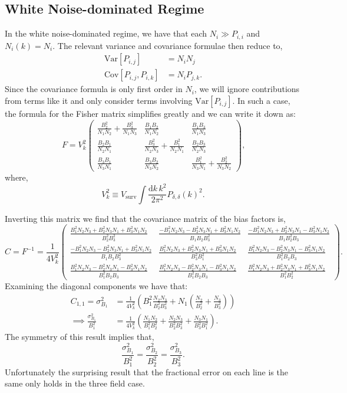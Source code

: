 \documentclass{aastex62}
\newcommand{\beq}{\begin{equation}}
\newcommand{\eeq}{\end{equation}}
\newcommand{\ps}[1]{\ensuremath{P_{#1,#1}}}
\newcommand{\xps}[2]{\ensuremath{P_{#1,#2}}}
\newcommand{\denps}{\ensuremath{P_{\delta,\delta}}}
\newcommand{\Var}[1]{\mathrm{Var}[#1]}
\newcommand{\Cov}[2]{\mathrm{Cov}[#1,#2]}
\begin{document}
\subsection{White Noise-dominated Regime} \label{ssec:tf_noisedom}
In the white noise-dominated regime, we have that each $N_i \gg \ps{i}$ and
$N_i(k) = N_i$. The relevant variance and covariance formulae then reduce to,
\beq\label{eq:var_cov}
\begin{split}
\Var{\xps{i}{j}} &= N_iN_j \\
\Cov{\xps{i}{j}}{\xps{i}{k}} &= N_i\xps{j}{k}\text{.}
\end{split}
\eeq
Since the covariance formula is only first order in $N_i$, we will ignore
contributions from terms like it and only consider terms involving
$\Var{\xps{i}{j}}$. In such a case, the formula for the Fisher matrix
simplifies greatly and we can write it down as:
\beq \label{eq:fmat_tf_exp}
F = V_k^2
\begin{pmatrix}
\frac{B_2^2}{N_1N_2}+\frac{B_3^2}{N_1N_3} & \frac{B_1B_2}{N_1N_2} & \frac{B_1B_3}{N_1N_3} \\
\frac{B_2B_1}{N_2N_1} & \frac{B_3^2}{N_2N_3}+\frac{B_1^2}{N_2N_1} & \frac{B_2B_3}{N_2N_3} \\
\frac{B_3B_1}{N_3N_1} & \frac{B_3B_2}{N_3N_2} & \frac{B_1^2}{N_3N_1}+\frac{B_2^2}{N_3N_2}
\end{pmatrix}
\text{,}
\eeq
where,
\beq \label{eq:Vk}
V_k^2 \equiv V_{\text{surv}} \int \frac{\text{d}k\,k^2}{2\pi^2} \denps(k)^2\text{.}
\eeq

Inverting this matrix we find that the covariance matrix of the bias factors is,
\beq \label{eq:covmat_tf_wn}
C = F^{-1} = \frac{1}{4V_k^2}
\begin{pmatrix}
\frac{B_1^2N_2N_3 + B_2^2N_3N_1 + B_3^2N_1N_2}{B_2^2B_3^2} & \frac{-B_1^2N_2N_3 - B_2^2N_3N_1 + B_3^2N_1N_2}{B_1B_2B_3^2} & \frac{-B_1^2N_2N_3 + B_2^2N_3N_1 - B_3^2N_1N_2}{B_1B_2^2B_3} \\
\frac{-B_1^2N_2N_3 - B_2^2N_3N_1 + B_3^2N_1N_2}{B_1B_2B_3^2} & \frac{B_1^2N_2N_3 + B_2^2N_3N_1 + B_3^2N_1N_2}{B_3^2B_1^2} & \frac{B_1^2N_2N_3 - B_2^2N_3N_1 - B_3^2N_1N_2}{B_1^2B_2B_3} \\
\frac{B_1^2N_2N_3 - B_2^2N_3N_1 - B_3^2N_1N_2}{B_1^2B_2B_3} & \frac{B_1^2N_2N_3 - B_2^2N_3N_1 - B_3^2N_1N_2}{B_1^2B_2B_3} & \frac{B_1^2N_2N_3 + B_2^2N_3N_1 + B_3^2N_1N_2}{B_1^2B_2^2}
\end{pmatrix}
\text{.}
\eeq
Examining the diagonal components we have that:
\beq \label{eq:var_bias_tf_wn}
\begin{split}
C_{1,1} = \sigma_{B_1}^2 &= \frac{1}{4V_k^2} \left( B_1^2 \frac{N_2N_3}{B_2^2B_3^2} + N_1(\frac{N_2}{B_2^2} + \frac{N_3}{B_3^2}) \right) \\
\implies \frac{\sigma_{B_1}^2}{B_1^2} &= \frac{1}{4V_k^2} \left( \frac{N_1N_2}{B_1^2B_2^2} + \frac{N_2N_3}{B_2^2B_3^2} + \frac{N_3N_1}{B_3^2B_1^2} \right)\text{.}
\end{split}
\eeq
The symmetry of this result implies that,
\beq \label{eq:frac_error_same}
\frac{\sigma_{B_1}^2}{B_1^2} = \frac{\sigma_{B_2}^2}{B_2^2} = 
\frac{\sigma_{B_3}^2}{B_3^2}\text{.}
\eeq
Unfortunately the surprising result that the fractional error on each line is
the same only holds in the three field case.
\end{document}
